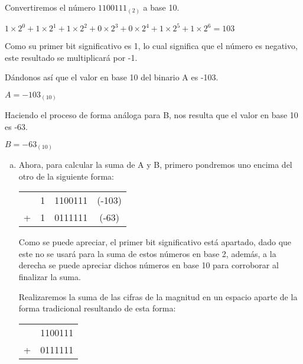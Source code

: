 \begin{frame}
\begin{solution}
\begin{enumerate}[a)]
                    Convertiremos el número $1100111_{(2)}$ a base 10.

                    $1\times2^0+1\times2^1+1\times2^2+0\times2^3+0\times2^4+1\times2^5+1\times2^6=103$

                    Como su primer bit significativo es 1, lo cual significa que el número es negativo, este resultado se multiplicará por -1.

                    Dándonos así que el valor en base 10 del binario A es -103.

                    $A=-103_{(10)}$

                    Haciendo el proceso de forma análoga para B, nos resulta que el valor en base 10 es -63.

                    $B=-63_{(10)}$
		\end{enumerate}
	\end{solution}
\end{frame}

\begin{frame}
\begin{solution}
    \begin{enumerate}[a)]
        \item
        Ahora, para calcular la suma de A y B, primero pondremos uno encima del otro de la siguiente forma:

        \begin{table}[]
            \begin{tabular}{c r l c}
                & \alert{1} & 1100111 & (-103)\\
               + & \alert{1} & 0111111 & (-63)\\
               \hline
            \end{tabular}
        \end{table}                 

        Como se puede apreciar, el primer bit significativo está apartado, dado que este no se usará para la suma de estos números en base 2, además, a la derecha se puede apreciar dichos números en base 10 para corroborar al finalizar la suma.

        Realizaremos la suma de las cifras de la magnitud en un espacio aparte de la forma tradicional resultando de esta forma:

        \begin{table}[]
            \begin{tabular}{c c}
                 & 1100111\\
               + & 0111111\\
               \hline
            \end{tabular}
        \end{table}
        
    \end{enumerate}
\end{solution}
    
\end{frame}